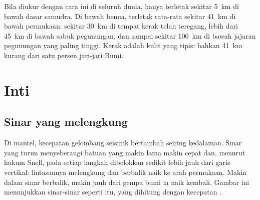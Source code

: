 Bila diukur dengan cara ini di seluruh dunia,  hanya terletak sekitar
\qty{5}{km} di bawah dasar samudra. Di bawah benua,  terletak rata-rata
sekitar \qty{41}{km} di bawah permukaan: sekitar \qty{30}{km} di tempat kerak
telah teregang, lebih dari \qty{45}{km} di bawah sabuk pegunungan, dan sampai
sekitar \qty{100}{km} di bawah jajaran pegunungan yang paling tinggi. Kerak
adalah kulit yang tipis: bahkan \qty{41}{km} kurang dari satu persen jari-jari
Bumi.

\section{Inti}

\subsection{Sinar yang melengkung}

Di mantel, kecepatan gelombang seismik bertambah seiring kedalaman. Sinar yang
turun menyeberangi batuan yang makin lama makin cepat dan, menurut hukum Snell,
pada setiap langkah dibelokkan sedikit lebih jauh dari garis vertikal:
lintasannya melengkung dan berbalik naik ke arah permukaan. Makin dalam sinar
berbalik, makin jauh dari gempa bumi ia naik kembali. Gambar ini menunjukkan
sinar-sinar seperti itu, yang dihitung dengan kecepatan .

